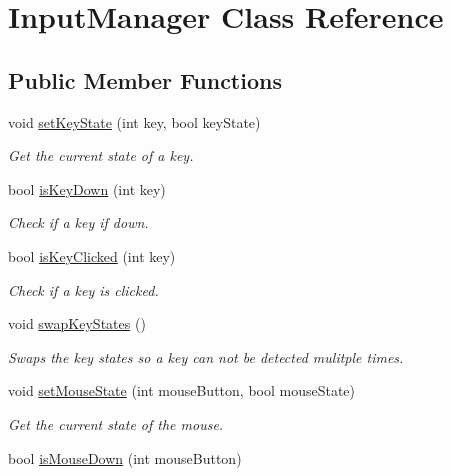 \hypertarget{class_input_manager}{}\section{Input\+Manager Class Reference}
\label{class_input_manager}
\subsection*{Public Member Functions}
\begin{DoxyCompactItemize}
\item 
void \hyperlink{class_input_manager_a338f09ddb8f3b9bead6435475b1b275e}{set\+Key\+State} (int key, bool key\+State)
\begin{DoxyCompactList}\small\item\em Get the current state of a key. \end{DoxyCompactList}\item 
bool \hyperlink{class_input_manager_a3a37bcfcd6428195120610fce9a68b7c}{is\+Key\+Down} (int key)
\begin{DoxyCompactList}\small\item\em Check if a key if down. \end{DoxyCompactList}\item 
bool \hyperlink{class_input_manager_ac75729c5eb7759a75d75f33aae910a13}{is\+Key\+Clicked} (int key)
\begin{DoxyCompactList}\small\item\em Check if a key is clicked. \end{DoxyCompactList}\item 
\mbox{\label{class_input_manager_aa49431b10d1723f02da790413fa8dde0}} 
void \hyperlink{class_input_manager_aa49431b10d1723f02da790413fa8dde0}{swap\+Key\+States} ()
\begin{DoxyCompactList}\small\item\em Swaps the key states so a key can not be detected mulitple times. \end{DoxyCompactList}\item 
void \hyperlink{class_input_manager_acf4ba5834b35bc0c309163b38cd28934}{set\+Mouse\+State} (int mouse\+Button, bool mouse\+State)
\begin{DoxyCompactList}\small\item\em Get the current state of the mouse. \end{DoxyCompactList}\item 
bool \hyperlink{class_input_manager_aed26b5ce7bc1c27272f4bd198965bd4b}{is\+Mouse\+Down} (int mouse\+Button)

\end{DoxyCompactItemize}
